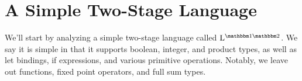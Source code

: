 \documentclass{article}
\newcommand {\bbone} {\mathbbm 1}
\newcommand {\bbtwo} {\mathbbm 2}
\newcommand {\corelang} {$\mathrm{L}^{\bbone\bbtwo}$}
\begin{document}
%
%
%
%
%

\section{A Simple Two-Stage Language}

We'll start by analyzing a simple two-stage language called \corelang.  We say it is simple in that it supports boolean, integer, and product types, as well as let bindings, if expressions, and various primitive operations.  Notably, we leave out functions, fixed point operators, and full sum types. 
\end{document}
